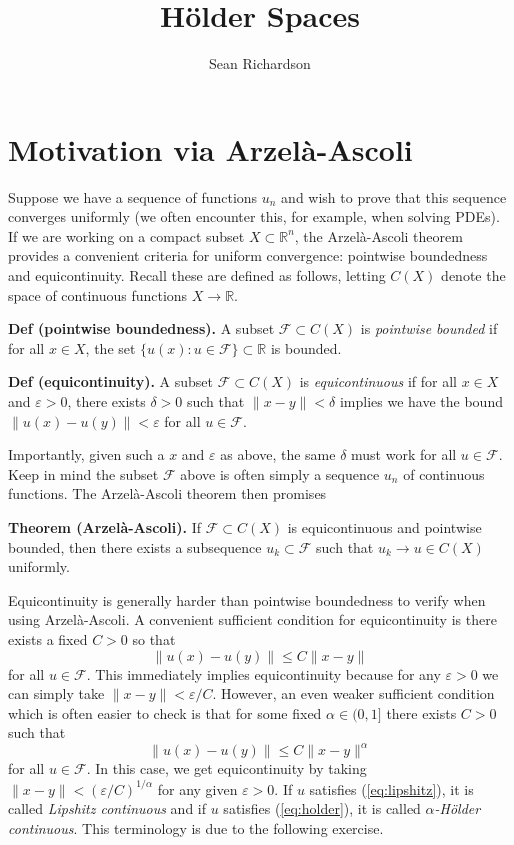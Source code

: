 \documentclass[
]{article}
\title{Hölder Spaces}
\author{Sean Richardson}
\date{}
\begin{document}
\maketitle

\hypertarget{motivation-via-arzeluxe0-ascoli}{%
\section{Motivation via
Arzelà-Ascoli}\label{motivation-via-arzeluxe0-ascoli}}

Suppose we have a sequence of functions \(u_n\) and wish to prove that
this sequence converges uniformly (we often encounter this, for example,
when solving PDEs). If we are working on a compact subset
\(X \subset \mathbb{R}^n\), the Arzelà-Ascoli theorem provides a
convenient criteria for uniform convergence: pointwise boundedness and
equicontinuity. Recall these are defined as follows, letting \(C(X)\)
denote the space of continuous functions \(X \to \mathbb{R}\).

\textbf{Def (pointwise boundedness).} A subset
\(\mathcal{F} \subset C(X)\) is \emph{pointwise bounded} if for all
\(x \in X\), the set \(\{u(x): u \in \mathcal{F}\} \subset \mathbb{R}\)
is bounded.

\textbf{Def (equicontinuity).} A subset \(\mathcal{F} \subset C(X)\) is
\emph{equicontinuous} if for all \(x \in X\) and \(\varepsilon > 0\),
there exists \(\delta > 0\) such that \(\|x-y\| < \delta\) implies we
have the bound \(\|u(x) - u(y)\| < \varepsilon\) for all
\(u \in \mathcal{F}\).

Importantly, given such a \(x\) and \(\varepsilon\) as above, the same
\(\delta\) must work for all \(u \in \mathcal{F}\). Keep in mind the
subset \(\mathcal{F}\) above is often simply a sequence \(u_n\) of
continuous functions. The Arzelà-Ascoli theorem then promises

\textbf{Theorem (Arzelà-Ascoli).} If \(\mathcal{F} \subset C(X)\) is
equicontinuous and pointwise bounded, then there exists a subsequence
\(u_k \subset \mathcal{F}\) such that \(u_k \to u \in C(X)\) uniformly.

Equicontinuity is generally harder than pointwise boundedness to verify
when using Arzelà-Ascoli. A convenient sufficient condition for
equicontinuity is there exists a fixed \(C > 0\) so that \[
    \|u(x) - u(y)\| \leq C \|x-y\| \tag{1} \label{eq:lipshitz}
\] for all \(u \in \mathcal{F}\). This immediately implies
equicontinuity because for any \(\varepsilon > 0\) we can simply take
\(\|x-y\| < \varepsilon/C\). However, an even weaker sufficient
condition which is often easier to check is that for some fixed
\(\alpha \in (0,1]\) there exists \(C > 0\) such that \[
    \|u(x) - u(y)\| \leq C \|x-y\|^{\alpha} \tag{2} \label{eq:holder}
\] for all \(u \in \mathcal{F}\). In this case, we get equicontinuity by
taking \(\|x-y\| < (\varepsilon/C)^{1/\alpha}\) for any given
\(\varepsilon > 0\). If \(u\) satisfies (\ref{eq:lipshitz}), it is
called \emph{Lipshitz continuous} and if \(u\) satisfies
(\ref{eq:holder}), it is called \emph{\(\alpha\)-Hölder continuous}.
This terminology is due to the following exercise.
\end{document}
